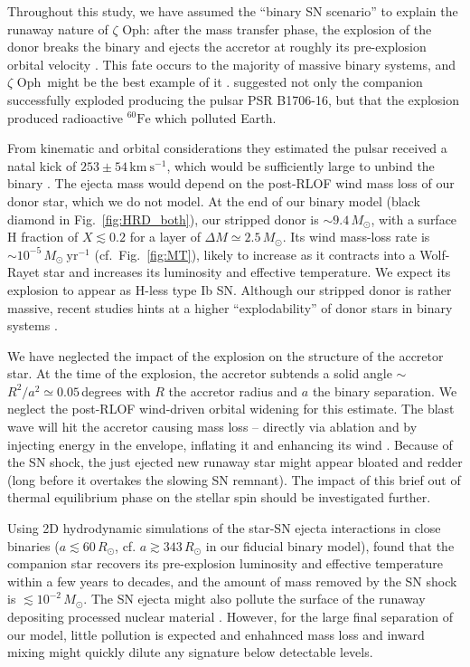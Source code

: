 \documentclass[twocolumn,twocolappendix,trackchanges]{aastex63}
\newcommand{\kms}{{\mathrm{km\ s^{-1}}}}
\DeclareRobustCommand{\Figref}[1]{Fig.~\ref{#1}}
\newcommand{\zoph}{$\zeta$ Oph}
\begin{document}
Throughout this study, we have assumed the ``binary SN scenario'' to
explain the runaway nature of \zoph:
after the mass transfer phase, the explosion of the donor breaks the
binary and ejects the accretor at roughly its pre-explosion orbital
velocity \citep[e.g.,][]{renzo:19walk}. This fate occurs to the
majority of massive binary systems, and \zoph\ might be the best
example of it \citep[e.g.,][]{blaauw:52, blaauw:61,
  hoogerwerf:00}. \cite{neuhauser:20} suggested not only the companion
successfully exploded producing the pulsar PSR B1706-16, but that the
explosion produced radioactive $^{60}\mathrm{Fe}$ which polluted
Earth.

From kinematic and orbital considerations they estimated the pulsar
received a natal kick of
$253\pm54\,\kms$, which would be sufficiently large to unbind the binary \citep{kalogera:96, tauris:15}.  The ejecta mass would depend on the post-RLOF wind mass loss of our donor star, which we do not model.  At the end of our binary model (black diamond in \Figref{fig:HRD_both}), our stripped donor is
$\sim$$9.4\,M_\odot$, with a surface H fraction of $X\lesssim0.2$ for
a layer of $\Delta M \simeq 2.5\,M_\odot$.  Its wind mass-loss rate is
$\sim10^{-5}\,M_\odot \ \mathrm{yr^{-1}}$ (cf.~\Figref{fig:MT}),
likely to increase as it contracts into a Wolf-Rayet star and
increases its luminosity and effective temperature. We expect its
explosion to appear as H-less type Ib SN. Although our stripped donor
is rather massive, recent studies hints at a higher ``explodability''
of donor stars in binary systems \citep[e.g.,][]{schneider:21,
  laplace:21, vartanyan:21}.

We have neglected the impact of the explosion on the structure of the
accretor star. At the time of the explosion, the accretor subtends a
solid angle $\sim$$R^2/a^2\simeq
0.05$\,degrees with $R$ the accretor radius and
$a$ the binary separation. We neglect the post-RLOF wind-driven orbital widening for this estimate.  The blast wave will hit the accretor causing mass loss -- directly via ablation and by injecting energy in the envelope, inflating it and enhancing its wind \citep{wheeler:75, tauris:98, podsiadlowski:03, hirai:18}.  Because of the SN shock, the just ejected new runaway star might appear bloated and redder (long before it overtakes the slowing SN remnant). The impact of this brief out of thermal equilibrium phase on the stellar spin should be investigated further.

Using 2D hydrodynamic simulations of the star-SN ejecta interactions in close binaries ($a\lesssim
60\,R_\odot$, cf. $a\gtrsim
343\,R_\odot$ in our fiducial binary model), \cite{hirai:18} found that the companion star recovers its pre-explosion luminosity and effective temperature within a few years to decades, and the amount of mass removed by the SN shock is
$\lesssim10^{-2}\,M_\odot$.  The SN ejecta might also pollute the surface of the runaway depositing processed nuclear material \citep[e.g.,][]{przybilla:08, suda:21}. However, for the large final separation of our model, little pollution is expected and enhahnced mass loss and inward mixing might quickly dilute any signature below detectable levels.
\end{document}
